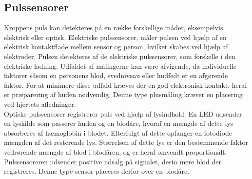 \subsection{Pulssensorer}\label{sec:pulssensor}
Kroppens puls kan detekteres på en række forskellige måder, eksempelvis elektrisk eller optisk.
Elektriske pulssensorer, måler pulsen ved hjælp af en elektrisk kontaktflade mellem sensor og person, hvilket skabes ved hjælp af elektroder. Pulsen detekteres af de elektriske pulssensorer, som forskelle i den elektriske ladning. Udfaldet af målingerne kan være afvigende, da individuelle faktorer såsom en personens blod, svedniveau eller hudfedt er en afgørende faktor. For at minimere disse udfald kræves der en god elektronisk kontakt, heraf er præparering af huden nødvendig. Denne type plusmåling kræver en placering ved hjertets afledninger. \citep{PhuaLissorguesMercier2009}  \\
Optiske pulssensorer registrerer puls ved hjælp af lysindhold. En LED udsender en lyskilde som passerer huden og en blodåre, hvoraf en mængde af dette lys absorberes af hæmoglobin i blodet. Efterfulgt af dette opfanger en fotodiode mængden af det resterende lys. Størrelsen af dette lys er den bestemmende faktor vedrørende mængde af blod i blodåren, og er heraf omvendt proportionalt. Pulssensoreren udsender positive udsalg på signalet, desto mere blod der registreres. Denne type sensor placeres derfor over en blodåre.\citep{PhuaLissorguesMercier2009,SrinivasReddySrinivas2006} 

%
	


